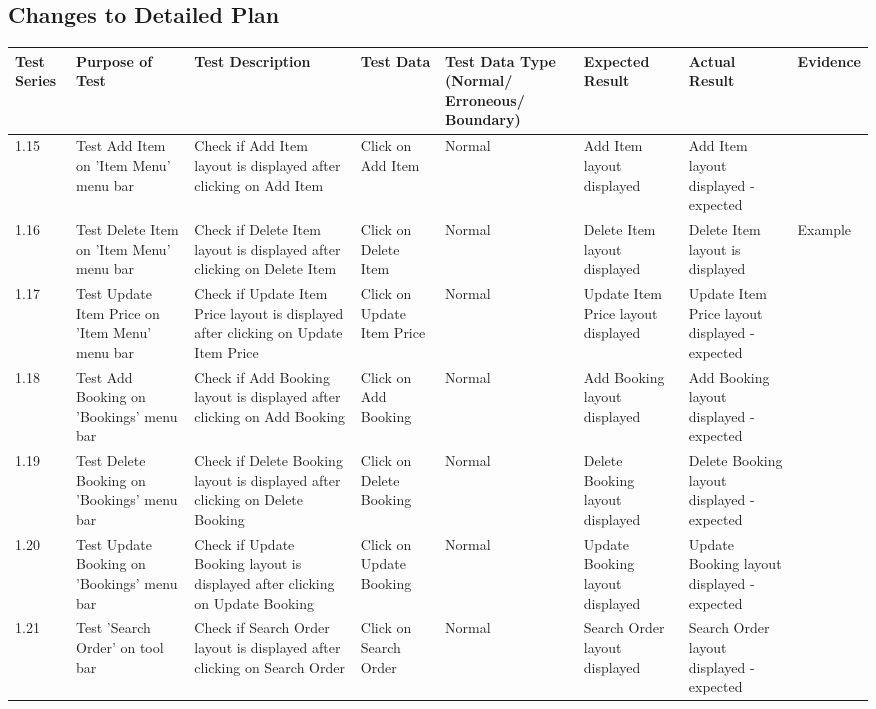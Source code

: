 \begin{landscape}
\subsection{Changes to Detailed Plan}

\begin{center}
    \begin{longtable}{|p{1.5cm}|p{2.5cm}|p{2.5cm}|p{2cm}|p{2cm}|p{2cm}|p{2cm}|p{2cm}|}
        \hline
        \textbf{Test Series} & \textbf{Purpose of Test} & \textbf{Test Description} & \textbf{Test Data} & \textbf{Test Data Type (Normal/ Erroneous/ Boundary)} & \textbf{Expected Result} & \textbf{Actual Result} & \textbf{Evidence}\\ \hline
       1.15 & Test Add Item on 'Item Menu' menu bar & Check if Add Item layout is displayed after clicking on Add Item & Click on Add Item & Normal & Add Item layout displayed & Add Item layout displayed - expected &  \\ \hline
       1.16 & Test Delete Item on 'Item Menu' menu bar & Check if Delete Item layout is displayed after clicking on Delete Item & Click on Delete Item & Normal & Delete Item layout displayed & Delete Item layout is displayed & Example \\ \hline
       1.17 & Test Update Item Price on 'Item Menu' menu bar & Check if Update Item Price layout is displayed after clicking on Update Item Price & Click on Update Item Price & Normal & Update Item Price layout displayed & Update Item Price layout displayed - expected & \\ \hline
       1.18 & Test Add Booking on 'Bookings' menu bar & Check if Add Booking layout is displayed after clicking on Add Booking & Click on Add Booking & Normal & Add Booking layout displayed &Add Booking layout displayed - expected &  \\ \hline
       1.19 & Test Delete Booking on 'Bookings' menu bar & Check if Delete Booking layout is displayed after clicking on Delete Booking & Click on Delete Booking & Normal & Delete Booking layout displayed & Delete Booking layout displayed - expected & \\ \hline
       1.20 & Test Update Booking on 'Bookings' menu bar & Check if Update Booking layout is displayed after clicking on Update Booking & Click on Update Booking & Normal & Update Booking layout displayed & Update Booking layout displayed - expected &  \\ \hline
       1.21 & Test 'Search Order' on tool bar & Check if Search Order layout is displayed after clicking on Search Order & Click on Search Order & Normal & Search Order layout displayed & Search Order layout displayed - expected & \\ \hline

\end{longtable}
\end{center}
\end{landscape}
